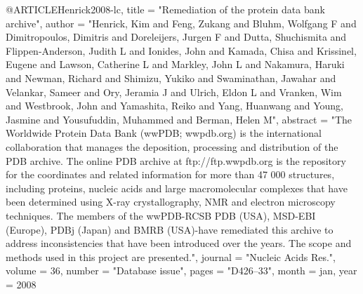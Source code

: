 @ARTICLE{Henrick2008-lc,
  title    = "Remediation of the protein data bank archive",
  author   = "Henrick, Kim and Feng, Zukang and Bluhm, Wolfgang F and
              Dimitropoulos, Dimitris and Doreleijers, Jurgen F and Dutta,
              Shuchismita and Flippen-Anderson, Judith L and Ionides, John and
              Kamada, Chisa and Krissinel, Eugene and Lawson, Catherine L and
              Markley, John L and Nakamura, Haruki and Newman, Richard and
              Shimizu, Yukiko and Swaminathan, Jawahar and Velankar, Sameer and
              Ory, Jeramia J and Ulrich, Eldon L and Vranken, Wim and
              Westbrook, John and Yamashita, Reiko and Yang, Huanwang and
              Young, Jasmine and Yousufuddin, Muhammed and Berman, Helen M",
  abstract = "The Worldwide Protein Data Bank (wwPDB; wwpdb.org) is the
              international collaboration that manages the deposition,
              processing and distribution of the PDB archive. The online PDB
              archive at ftp://ftp.wwpdb.org is the repository for the
              coordinates and related information for more than 47 000
              structures, including proteins, nucleic acids and large
              macromolecular complexes that have been determined using X-ray
              crystallography, NMR and electron microscopy techniques. The
              members of the wwPDB-RCSB PDB (USA), MSD-EBI (Europe), PDBj
              (Japan) and BMRB (USA)-have remediated this archive to address
              inconsistencies that have been introduced over the years. The
              scope and methods used in this project are presented.",
  journal  = "Nucleic Acids Res.",
  volume   =  36,
  number   = "Database issue",
  pages    = "D426--33",
  month    =  jan,
  year     =  2008
}

